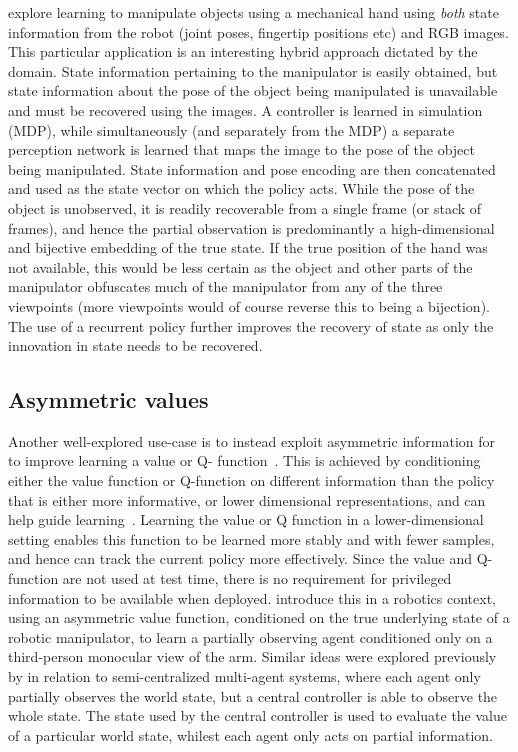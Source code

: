 \citet{Andrychowicz2020} explore learning to manipulate objects using a mechanical hand using \emph{both} state information from the robot (joint poses, fingertip positions etc) and RGB images.  This particular application is an interesting hybrid approach dictated by the domain.  State information pertaining to the manipulator is easily obtained, but state information about the pose of the object being manipulated is unavailable and must be recovered using the images.  A controller is learned in simulation (MDP), while simultaneously (and separately from the MDP) a separate perception network is learned that maps the image to the pose of the object being manipulated.  State information and pose encoding are then concatenated and used as the state vector on which the policy acts.  While the pose of the object is unobserved, it is readily recoverable from a single frame (or stack of frames), and hence the partial observation is predominantly a high-dimensional and bijective embedding of the true state.  If the true position of the hand was not available, this would be less certain as the object and other parts of the manipulator obfuscates much of the manipulator from any of the three viewpoints (more viewpoints would of course reverse this to being a bijection).  The use of a recurrent policy further improves the recovery of state as only the innovation in state needs to be recovered. 

\subsection{Asymmetric values}
Another well-explored use-case is to instead exploit asymmetric information for to improve learning a value or Q- function~\citep{kononen2004asymmetric, pinto2017asymmetric, Andrychowicz2020}.  This is achieved by conditioning either the value function or Q-function on different information than the policy that is either more informative, or lower dimensional representations, and can help guide learning~\cite{kononen2004asymmetric, pinto2017asymmetric}.  Learning the value or Q function in a lower-dimensional setting enables this function to be learned more stably and with fewer samples, and hence can track the current policy more effectively.  Since the value and Q-function are not used at test time, there is no requirement for privileged information to be available when deployed.  \citet{pinto2017asymmetric} introduce this in a robotics context, using an asymmetric value function, conditioned on the true underlying state of a robotic manipulator, to learn a partially observing agent conditioned only on a third-person monocular view of the arm.  Similar ideas were explored previously by \citet{kononen2004asymmetric} in relation to semi-centralized multi-agent systems, where each agent only partially observes the world state, but a central controller is able to observe the whole state.  The state used by the central controller is used to evaluate the value of a particular world state, whilest each agent only acts on partial information.

